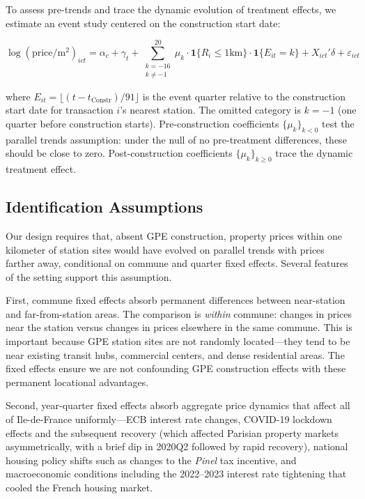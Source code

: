 \documentclass[12pt]{article}
\newcommand{\ind}{\mathbf{1}}
\begin{document}
To assess pre-trends and trace the dynamic evolution of treatment effects, we estimate an event study centered on the construction start date:

\begin{equation}
\label{eq:event}
\log(\text{price}/\text{m}^2)_{ict} = \alpha_c + \gamma_t + \sum_{\substack{k=-16 \\ k \neq -1}}^{20} \mu_k \cdot \ind\{R_i \leq 1\text{km}\} \cdot \ind\{E_{it} = k\} + X_{ict}'\delta + \varepsilon_{ict}
\end{equation}

\noindent where $E_{it} = \lfloor (t - t_{\text{Constr}}) / 91 \rfloor$ is the event quarter relative to the construction start date for transaction $i$'s nearest station. The omitted category is $k = -1$ (one quarter before construction starts). Pre-construction coefficients $\{\mu_k\}_{k<0}$ test the parallel trends assumption: under the null of no pre-treatment differences, these should be close to zero. Post-construction coefficients $\{\mu_k\}_{k \geq 0}$ trace the dynamic treatment effect.

\subsection{Identification Assumptions}

Our design requires that, absent GPE construction, property prices within one kilometer of station sites would have evolved on parallel trends with prices farther away, conditional on commune and quarter fixed effects. Several features of the setting support this assumption.

First, commune fixed effects absorb permanent differences between near-station and far-from-station areas. The comparison is \textit{within} commune: changes in prices near the station versus changes in prices elsewhere in the same commune. This is important because GPE station sites are not randomly located---they tend to be near existing transit hubs, commercial centers, and dense residential areas. The fixed effects ensure we are not confounding GPE construction effects with these permanent locational advantages.

Second, year-quarter fixed effects absorb aggregate price dynamics that affect all of Ile-de-France uniformly---ECB interest rate changes, COVID-19 lockdown effects and the subsequent recovery (which affected Parisian property markets asymmetrically, with a brief dip in 2020Q2 followed by rapid recovery), national housing policy shifts such as changes to the \textit{Pinel} tax incentive, and macroeconomic conditions including the 2022--2023 interest rate tightening that cooled the French housing market.
\end{document}
